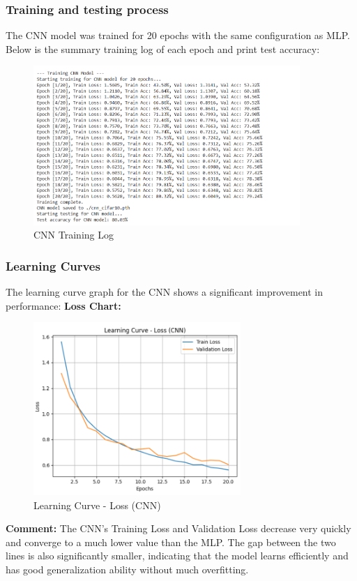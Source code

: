 \documentclass[12pt]{article}
\begin{document}
\subsubsection{Training and testing process}
The CNN model was trained for 20 epochs with the same configuration as MLP. Below is the summary training log of each epoch and print test accuracy:
\begin{figure}[H]
    \centering
    \hspace*{2cm}\includegraphics[width=0.9\textwidth]{Screenshots/Ảnh chụp màn hình 2025-05-23 223434.png} %
    \caption{CNN Training Log}
    \label{fig:cnn_training_log}
\end{figure}

\subsubsection{Learning Curves}
The learning curve graph for the CNN shows a significant improvement in performance:
\textbf{Loss Chart:}
\begin{figure}[H]
    \centering
    \includegraphics[width=0.7\textwidth]{Screenshots/Ảnh chụp màn hình 2025-05-23 223515.png} %
    \caption{Learning Curve - Loss (CNN)}
    \label{fig:cnn_loss_chart}
\end{figure}
\textbf{Comment:} The CNN's Training Loss and Validation Loss decrease very quickly and converge to a much lower value than the MLP. The gap between the two lines is also significantly smaller, indicating that the model learns efficiently and has good generalization ability without much overfitting.
\end{document}
